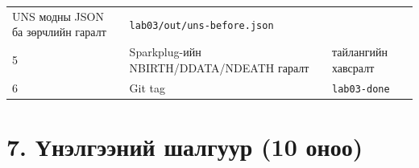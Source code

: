\begin{longtable}[]{@{}lll@{}}
\begin{minipage}[t]{0.30\columnwidth}
UNS модны JSON ба зөрчлийн гаралт\strut
\end{minipage} & \begin{minipage}[t]{0.30\columnwidth}\raggedright
\texttt{lab03/\allowbreak{}out/\allowbreak{}uns-before.\allowbreak{}json}\strut
\end{minipage}\tabularnewline
\begin{minipage}[t]{0.30\columnwidth}\raggedright
5\strut
\end{minipage} & \begin{minipage}[t]{0.30\columnwidth}\raggedright
Sparkplug-ийн NBIRTH/DDATA/NDEATH гаралт\strut
\end{minipage} & \begin{minipage}[t]{0.30\columnwidth}\raggedright
тайлангийн хавсралт\strut
\end{minipage}\tabularnewline
\begin{minipage}[t]{0.30\columnwidth}\raggedright
6\strut
\end{minipage} & \begin{minipage}[t]{0.30\columnwidth}\raggedright
Git tag\strut
\end{minipage} & \begin{minipage}[t]{0.30\columnwidth}\raggedright
\texttt{lab03-done}\strut
\end{minipage}\tabularnewline
\bottomrule
\end{longtable}\endgroup

\hypertarget{ux4afux43dux44dux43bux433ux44dux44dux43dux438ux439-ux448ux430ux43bux433ux443ux443ux440-10-ux43eux43dux43eux43e}{%
\section{7. Үнэлгээний шалгуур (10 оноо)}\label{ux4afux43dux44dux43bux433ux44dux44dux43dux438ux439-ux448ux430ux43bux433ux443ux443ux440-10-ux43eux43dux43eux43e}}

